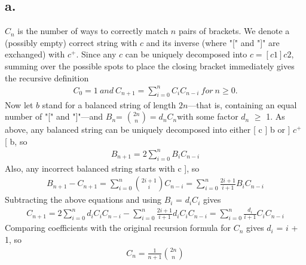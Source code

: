 \documentclass[12pt]{article}
\begin{document}
\subsection*{a.}
$C_n$ is the number of ways to correctly match $n$ pairs of brackets. We denote a (possibly empty) correct string with $c$ and its inverse (where "[" and "]" are exchanged) with $c^+$. Since any $c$ can be uniquely decomposed into $c = [ c1 ] c2$, summing over the possible spots to place the closing bracket immediately gives the recursive definition
\begin{align*}
C_0=1 \ and \ C_{n+1}=\sum_{i=0}^{n} C_iC_{n-i}\ for\ n\geq0.
\end{align*}
Now let $b$ stand for a balanced string of length $2n$—that is, containing an equal number of "[" and "]"—and $B_n$= ${\binom{2n}{n}}= d_nC_n$with some factor $d_n$ $\geq$ 1. As above, any balanced string can be uniquely decomposed into either [ c ] b or ] $c^+$ [ b, so
\begin{align*}
B_{n+1} = 2\sum_{i=0}^{n} B_iC_{n-i}
\end{align*}
Also, any incorrect balanced string starts with c ], so
\begin{align*}
B_{n+1} - C_{n+1} =\sum_{i=0}^{n}{\binom{2i+1}{i}} C_{n-i} =\sum_{i=0}^{n}\frac{2i+1}{i+1}B_iC_{n-i} 
\end{align*}
Subtracting the above equations and using $B_i$ = $d_i C_i$ gives
\begin{align*}
C_{n+1}= 2\sum_{i=0}^{n} d_i C_i C_{n-i} - \sum_{i=0}^{n} \frac{2i+1}{i+1}d_i C_i C_{n-i} = \sum_{i=0}^{n} \frac{d_i}{i+1} C_i C_{n-i}
\end{align*}
Comparing coefficients with the original recursion formula for $C_n$ gives $d_i$ = $i$ + 1, so
\begin{align*}
C_n = \frac{1}{n+1}\binom{2n}{n}
\end{align*}
\end{document}
